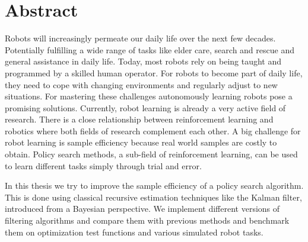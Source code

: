 
\chapter*{Abstract}

Robots will increasingly permeate our daily life over the next few decades.
Potentially fulfilling a wide range of tasks like elder care, search
and rescue and general assistance in daily life.
Today, most robots rely on being
taught and programmed by a skilled human operator.
For robots to become part of daily life, they need to cope
with changing environments and regularly adjust to new situations.
For mastering these challenges autonomously learning robots pose a
promising solutions.
Currently, robot learning is already
a very active field of research. There is a close
relationship between reinforcement learning and
robotics where both fields of research complement each other.
A big challenge for robot learning is sample efficiency
because real world samples are costly to obtain.
Policy search methods, a sub-field of reinforcement learning,
can be used to learn different tasks simply through trial and error.


In this thesis we try to improve the sample efficiency
of a policy search algorithm.
This is done using classical recursive estimation
techniques like the Kalman filter, introduced from a Bayesian perspective.
We implement different versions of filtering algorithms and compare them with
previous methods and benchmark them on optimization test functions
and various simulated robot tasks.
